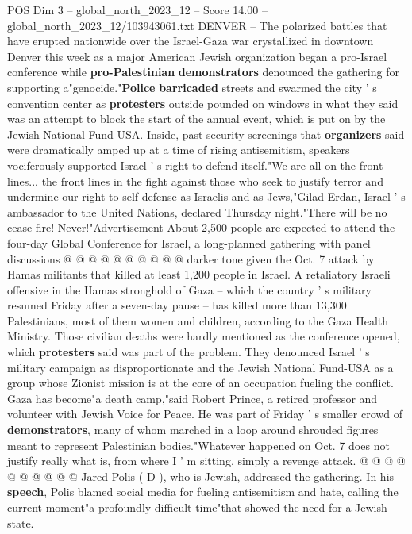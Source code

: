 \begin{textsample}{POS Dim 3 – global\_north\_2023\_12 – Score 14.00 – global\_north\_2023\_12/103943061.txt}  \label{ex:f3_pos_226}
DENVER -- The polarized battles that have erupted nationwide over the Israel-Gaza war crystallized in downtown Denver this week as a major American Jewish organization began a pro-Israel conference while \textbf{pro-Palestinian} \textbf{demonstrators} denounced the gathering for supporting a"genocide."\textbf{Police} \textbf{barricaded} streets and swarmed the city ' s convention center as \textbf{protesters} outside pounded on windows in what they said was an attempt to block the start of the annual event, which is put on by the Jewish National Fund-USA.
Inside, past security screenings that \textbf{organizers} said were dramatically amped up at a time of rising antisemitism, speakers vociferously supported Israel ' s right to defend itself."We are all on the front lines... the front lines in the fight against those who seek to justify terror and undermine our right to self-defense as Israelis and as Jews,"Gilad Erdan, Israel ' s ambassador to the United Nations, declared Thursday night."There will be no cease-fire!
Never!"Advertisement About 2,500 people are expected to attend the four-day Global Conference for Israel, a long-planned gathering with panel discussions @ @ @ @ @ @ @ @ @ @ darker tone given the Oct. 7 attack by Hamas militants that killed at least 1,200 people in Israel.
A retaliatory Israeli offensive in the Hamas stronghold of Gaza -- which the country ' s military resumed Friday after a seven-day pause -- has killed more than 13,300 Palestinians, most of them women and children, according to the Gaza Health Ministry.
Those civilian deaths were hardly mentioned as the conference opened, which \textbf{protesters} said was part of the problem.
They denounced Israel ' s military campaign as disproportionate and the Jewish National Fund-USA as a group whose Zionist mission is at the core of an occupation fueling the conflict.
Gaza has become"a death camp,"said Robert Prince, a retired professor and volunteer with Jewish Voice for Peace.
He was part of Friday ' s smaller crowd of \textbf{demonstrators}, many of whom marched in a loop around shrouded figures meant to represent Palestinian bodies."Whatever happened on Oct. 7 does not justify really what is, from where I ' m sitting, simply a revenge attack. @ @ @ @ @ @ @ @ @ @ Jared Polis ( D ), who is Jewish, addressed the gathering.
In his \textbf{speech}, Polis blamed social media for fueling antisemitism and hate, calling the current moment"a profoundly difficult time"that showed the need for a Jewish state.

\end{textsample}
